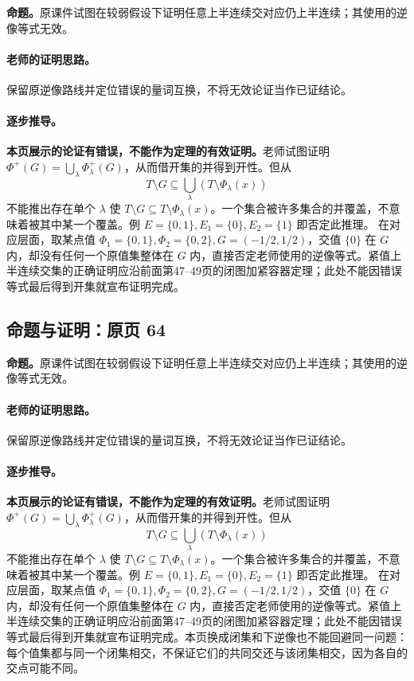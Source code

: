\textbf{命题。}原课件试图在较弱假设下证明任意上半连续交对应仍上半连续；其使用的逆像等式无效。

\paragraph{老师的证明思路。}保留原逆像路线并定位错误的量词互换，不将无效论证当作已证结论。

\paragraph{逐步推导。}\textbf{本页展示的论证有错误，不能作为定理的有效证明。}老师试图证明 $\Phi^+(G)=\bigcup_\lambda\Phi_\lambda^+(G)$，从而借开集的并得到开性。但从
\[T\setminus G\subseteq\bigcup_\lambda(T\setminus\Phi_\lambda(x))\]
不能推出存在单个 $\lambda$ 使 $T\setminus G\subseteq T\setminus\Phi_\lambda(x)$。一个集合被许多集合的并覆盖，不意味着被其中某一个覆盖。例 $E=\{0,1\},E_1=\{0\},E_2=\{1\}$ 即否定此推理。
在对应层面，取某点值 $\Phi_1=\{0,1\},\Phi_2=\{0,2\},G=(-1/2,1/2)$，交值 $\{0\}$ 在 $G$ 内，却没有任何一个原值集整体在 $G$ 内，直接否定老师使用的逆像等式。紧值上半连续交集的正确证明应沿前面第47--49页的闭图加紧容器定理；此处不能因错误等式最后得到开集就宣布证明完成。

\subsection{命题与证明：原页 64}

\textbf{命题。}原课件试图在较弱假设下证明任意上半连续交对应仍上半连续；其使用的逆像等式无效。

\paragraph{老师的证明思路。}保留原逆像路线并定位错误的量词互换，不将无效论证当作已证结论。

\paragraph{逐步推导。}\textbf{本页展示的论证有错误，不能作为定理的有效证明。}老师试图证明 $\Phi^+(G)=\bigcup_\lambda\Phi_\lambda^+(G)$，从而借开集的并得到开性。但从
\[T\setminus G\subseteq\bigcup_\lambda(T\setminus\Phi_\lambda(x))\]
不能推出存在单个 $\lambda$ 使 $T\setminus G\subseteq T\setminus\Phi_\lambda(x)$。一个集合被许多集合的并覆盖，不意味着被其中某一个覆盖。例 $E=\{0,1\},E_1=\{0\},E_2=\{1\}$ 即否定此推理。
在对应层面，取某点值 $\Phi_1=\{0,1\},\Phi_2=\{0,2\},G=(-1/2,1/2)$，交值 $\{0\}$ 在 $G$ 内，却没有任何一个原值集整体在 $G$ 内，直接否定老师使用的逆像等式。紧值上半连续交集的正确证明应沿前面第47--49页的闭图加紧容器定理；此处不能因错误等式最后得到开集就宣布证明完成。本页换成闭集和下逆像也不能回避同一问题：每个值集都与同一个闭集相交，不保证它们的共同交还与该闭集相交，因为各自的交点可能不同。

